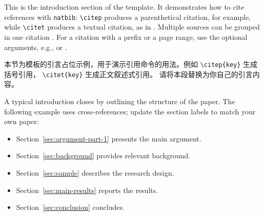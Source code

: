 
This is the introduction section of the template. It demonstrates how to
cite references with \texttt{natbib}: \texttt{\textbackslash citep} produces
a parenthetical citation, \citep{author2020example} for example, while
\texttt{\textbackslash citet} produces a textual citation, as in
\citet{author2018book}. Multiple sources can be grouped in one citation
\citep{author2019chapter,author2024working}. For a citation with a prefix or
a page range, use the optional arguments, e.g.,
\citep[e.g.,][]{author2020example} or \citep[pp.~12--14]{author2018book}.

本节为模板的引言占位示例，用于演示引用命令的用法。例如
\texttt{\textbackslash citep\{key\}} 生成括号引用，
\texttt{\textbackslash citet\{key\}} 生成正文叙述式引用。
请将本段替换为你自己的引言内容。

A typical introduction closes by outlining the structure of the paper. The
following example uses cross-references; update the section labels to match
your own paper:

\begin{itemize}
  \item Section~\ref{sec:argument-part-1} presents the main argument.
  \item Section~\ref{sec:background} provides relevant background.
  \item Section~\ref{sec:sample} describes the research design.
  \item Section~\ref{sec:main-results} reports the results.
  \item Section~\ref{sec:conclusion} concludes.
\end{itemize}

